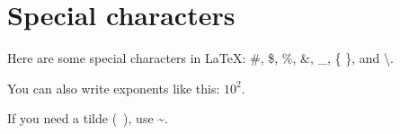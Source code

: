 \section{Special characters}

Here are some special characters in LaTeX: \#, \$, \%, \&, \_, \{ \}, and \textbackslash{}.

You can also write exponents like this: \(10^{2}\).

If you need a tilde (~), use \textasciitilde{}.
